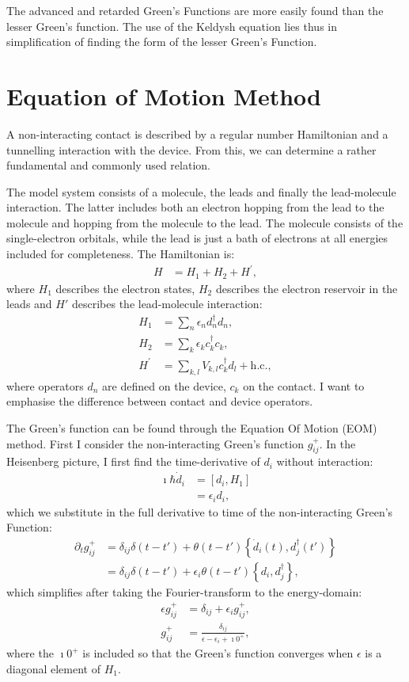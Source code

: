 The advanced and retarded Green's Functions are more easily found than the lesser Green's function. The use of the Keldysh equation lies thus in simplification of finding the form of the lesser Green's Function.

\section{Equation of Motion Method}
\label{sec:eommethod}
A non\hyp{}interacting contact is described by a regular number Hamiltonian and a tunnelling interaction with the device. From this, we can determine a rather fundamental and commonly used relation. 

The model system consists of a molecule, the leads and finally the lead-molecule interaction. The latter includes both an electron hopping from the lead to the molecule and hopping from the molecule to the lead. The molecule consists of the single-electron orbitals, while the lead is just a bath of electrons at all energies included for completeness. The Hamiltonian is:
\begin{align}
H &= H_1 + H_2 + H^\prime, \label{eq:hamiltonian}
\end{align} 
where $H_1$ describes the electron states, $H_2$ describes the electron reservoir in the leads and $H'$ describes the lead-molecule interaction:
\begin{align*}
H_1 &= \sum_n \epsilon_n d^\dagger_n d_n ,\\
H_2 &= \sum_{k} \epsilon_k c^\dagger_{k} c_{k} ,\\
H^\prime &= \sum_{k, l} V_{k, l} c^\dagger_{k} d_l + \text{h.c.},
\end{align*} where operators $d_n$ are defined on the device, $c_{k}$ on the contact. I want to emphasise the difference between contact and device operators. 

The Green's function can be found through the Equation Of Motion (EOM) method. First I consider the non-interacting Green's function $g_{ij}^+$. In the Heisenberg picture, I first find the time-derivative of $d_i$ without interaction:
\begin{align*}
\imath \hbar \dot{d}_i &= \left[d_i, H_1\right] \\
&= \epsilon_i d_i,
\end{align*} which we substitute in the full derivative to time of the non-interacting Green's Function: \begin{align*}
\partial_t g_{ij}^+ &= \delta_{ij} \delta(t-t') + \theta(t-t')\left\{ \dot{d}_i(t), d_j^\dagger(t')\right\} \\
&= \delta_{ij} \delta(t-t') +\epsilon_i \theta(t-t')\left\{ d_i, d_j^\dagger\right\},
\end{align*} which simplifies after taking the Fourier-transform to the energy-domain:
\begin{align*}
\epsilon g_{ij}^+ &= \delta_{ij} + \epsilon_i g_{ij}^+, \\
g_{ij}^+ &= \frac{ \delta_{ij} }{ \epsilon - \epsilon_i + \imath 0^+},
\end{align*}
where the $\imath 0^+$ is included so that the Green's function converges when $\epsilon$ is a diagonal element of $H_1$.

